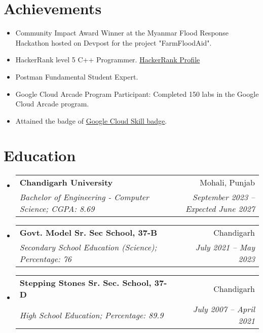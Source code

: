 \documentclass[apaper,20pt]{article}
\makeatletter
\newcommand{\MYhref}[3][primaryColor]{\href{#2}{{\color{#1}#3}}}
\newcommand{\resumeSubheading}[4]{
  \vspace{-1pt}\item
    \begin{tabular*}{0.97\textwidth}{l@{\extracolsep{\fill}}r}
      \textbf{#1} & #2 \\
      \textit{#3} & \textit{#4} \\
    \end{tabular*}\vspace{-5pt}
}
\newcommand{\resumeSubHeadingListStart}{\begin{itemize}[leftmargin=*]}
\newcommand{\resumeSubHeadingListEnd}{\end{itemize}}
\makeatother
\begin{document}
\section{Achievements}
\resumeSubHeadingListStart
\item Community Impact Award Winner at the Myanmar Flood Response Hackathon hosted on Devpost for the project "FarmFloodAid".
\item HackerRank level 5 C++ Programmer.
{\MYhref{https://www.hackerrank.com/nikhils_sharma21}{HackerRank Profile}}
\item Postman Fundamental Student Expert.
\item Google Cloud Arcade Program Participant: Completed 150 labs in the Google Cloud Arcade program.
\item Attained the badge of {\MYhref{https://www.cloudskillsboost.google/public_profiles/158ff43d-244d-49d7-9269-b6014d626472}{Google Cloud Skill badge}}.
\resumeSubHeadingListEnd

\section{Education}
\resumeSubHeadingListStart
\resumeSubheading{Chandigarh University}{Mohali, Punjab}{Bachelor of Engineering - Computer Science; CGPA: 8.69}{September 2023 -- Expected June 2027}
\resumeSubheading{Govt. Model Sr. Sec School, 37-B}{Chandigarh}{Secondary School Education (Science); Percentage: 76}{July 2021 -- May 2023}
\resumeSubheading{Stepping Stones Sr. Sec. School, 37-D}{Chandigarh}{High School Education; Percentage: 89.9}{July 2007 -- April 2021}
\resumeSubHeadingListEnd
\end{document}
